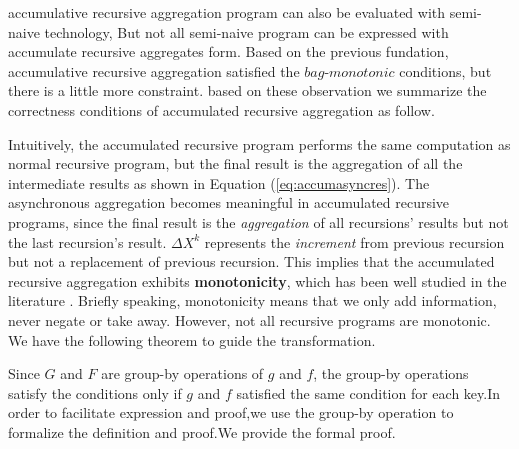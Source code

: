 {{\color{green}	
accumulative recursive aggregation program can also be evaluated with semi-naive technology, 
But not all semi-naive program can be expressed with accumulate recursive aggregates form.  %
Based on the previous fundation, accumulative recursive aggregation  satisfied the $bag$-$monotonic$ conditions, but there is a little more constraint.
based on these observation we summarize the correctness conditions of accumulated recursive aggregation as follow.
}


{\color{green}
Intuitively, the accumulated recursive program performs the same computation as normal recursive program, but the final result is the aggregation of all the intermediate results as shown in Equation (\ref{eq:accumasyncres}). The asynchronous aggregation becomes meaningful in accumulated recursive programs, since the final result is the \emph{aggregation} of all recursions' results but not the last recursion's result. $\Delta X^{k}$ represents the \emph{increment} from previous recursion but not a replacement of previous recursion. This implies that the accumulated recursive aggregation exhibits \textbf{monotonicity}, which has been well studied in the literature \cite{Hellerstein:2010:DIE:1860702.1860704,calm,Lam:2013:SDE:2510649.2511289,Wang:2015:AFR:2824032.2824052}. Briefly speaking, monotonicity means that we only add information, never negate or take away. However, not all recursive programs are monotonic. We have the following theorem to guide the transformation.
}

{\color{green}
Since $G$ and $F$ are group-by operations of $g$ and $f$, the group-by operations satisfy the conditions only if $g$ and $f$ satisfied the same condition for each key.In order to facilitate expression and proof,we use the group-by operation to formalize the definition and proof.We provide the formal proof.}

}
